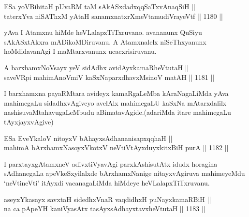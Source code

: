 

\begin{shl}
ESa yoV\s BihitaH pUvaRM taM sAkASxdadxqqSaTxvAnaqSiH || \\
taterxYva niSAThxM yAtaH sanamxnatxrXmeVtamudiVrayeVtf \hfill || 1180 ||  
\end{shl}

\begin{artha}
yAva I Atamxnu hiMde heVLalapxTiTxruvano. avananunx QuSiyu sAkASxtAkxra mADikoMDiruvanu. A Atamxnalelx niSeThxyanunx hoMdidavanAgi I maMtarxvanunx ucacxrisiruvanu.
\end{artha}


\begin{shl}
A barxhamxNoV\s sayx yeV sidAdhx avidAyxkamaRheVtutaH || \\
saveVR\s pi mahimAnoV\s miV kaSxNaparxdhavxMsinoV matAH \hfill || 1181 ||  
\end{shl}

\begin{artha}
I barxhamxna payaRMtara avideyx kamaRgaLeMba kAraNagaLiMda yAva mahimegaLu sidadhxvAgiveyo avelAlx mahimegaLU kaSxNa mAtarxdalilx nashisuvaMtahavugaLeMbudu aBimatavAgide.(adariMda itare mahimegaLu tAyxjayxvAgive)
\end{artha}

\begin{shl}
ESa EveYkaloV nitoyxV bAhayxsAdhananisapxqqhaH || \\
mahimA bArxhamxNasoyxVkotxV neVtiVtAyxduyxkitxBiH purA \hfill || 1182 ||  
\end{shl}

\begin{artha}
I parxtayxgAtamxneV adivxtiVyavAgi parxkAshisutAtx idudx horagina sAdhanegaLa apeVkeSxyilalxde bArxhamxNanige nitayxvAgiruva mahimeyeMdu `neVtineVti' itAyxdi vacanagaLiMda hiMdeye heVLalapxTiTxruvanu.
\end{artha}

\begin{shl}
aseyxYkasayx savxtaH sidedhxVnaR vaqdidhxH puNayxkamaRBiH || \\
na ca pApeYH kaniVyasAtx tasAyxsAdhayxtavxheVtutaH \hfill || 1183 ||  
\end{shl}

